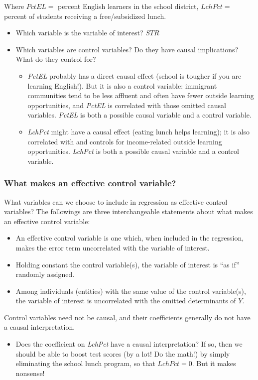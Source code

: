\documentclass[a4paper,11pt]{article}
\begin{document}
Where \(PctEL=\) percent English learners in the school district,
\(LchPct=\) percent of students receiving a free/subsidized lunch.

\begin{itemize}
\item Which variable is the variable of interest? \(STR\)
\item Which variables are control variables? Do they have causal
implications? What do they control for?
\begin{itemize}
\item \emph{PctEL} probably has a direct causal effect (school is tougher if
you are learning English!).  But it is also a control variable:
immigrant communities tend to be less affluent and often have
fewer outside learning opportunities, and \emph{PctEL} is correlated with
those omitted causal variables.  \emph{PctEL} is both a possible causal
variable and a control variable.
\item \emph{LchPct} might have a causal effect (eating lunch helps learning);
it is also correlated with and controls for income-related outside
learning opportunities.  \emph{LchPct} is both a possible causal variable
and a control variable.
\end{itemize}
\end{itemize}

\subsubsection*{What makes an effective control variable?}
\label{sec:org1958dec}

What variables can we choose to include in regression as effective
control variables?  The followings are three interchangeable
statements about what makes an effective control variable:
\begin{itemize}
\item An effective control variable is one which, when included in
the regression, makes the error term uncorrelated with the variable of
interest.
\item Holding constant the control variable(s), the variable of interest
is “as if” randomly assigned.
\item Among individuals (entities) with the same value of the control
variable(s), the variable of interest is uncorrelated with the
omitted determinants of \(Y\).
\end{itemize}

Control variables need not be causal, and their coefficients
generally do not have a causal interpretation.
\begin{itemize}
\item Does the coefficient on \emph{LchPct} have a causal interpretation?  If
so, then we should be able to boost test scores (by a lot! Do the
math!) by simply eliminating the school lunch program, so that
\(LchPct = 0\). But it makes nonsense!
\end{itemize}
\end{document}
